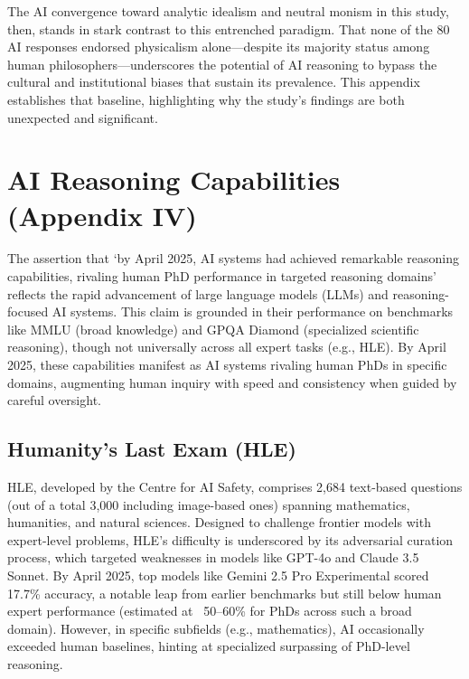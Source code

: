\documentclass[11pt]{article}
\begin{document}
The AI convergence toward analytic idealism and neutral monism in this study, then, stands in stark contrast to this entrenched paradigm. That none of the 80 AI responses endorsed physicalism alone—despite its majority status among human philosophers—underscores the potential of AI reasoning to bypass the cultural and institutional biases that sustain its prevalence. This appendix establishes that baseline, highlighting why the study’s findings are both unexpected and significant.

\section{AI Reasoning Capabilities (Appendix IV)}
The assertion that ‘by April 2025, AI systems had achieved remarkable reasoning capabilities, rivaling human PhD performance in targeted reasoning domains’ reflects the rapid advancement of large language models (LLMs) and reasoning-focused AI systems. This claim is grounded in their performance on benchmarks like MMLU (broad knowledge) and GPQA Diamond (specialized scientific reasoning), though not universally across all expert tasks (e.g., HLE). By April 2025, these capabilities manifest as AI systems rivaling human PhDs in specific domains, augmenting human inquiry with speed and consistency when guided by careful oversight.

\subsection{Humanity’s Last Exam (HLE)}
HLE, developed by the Centre for AI Safety, comprises 2,684 text-based questions (out of a total 3,000 including image-based ones) spanning mathematics, humanities, and natural sciences. Designed to challenge frontier models with expert-level problems, HLE’s difficulty is underscored by its adversarial curation process, which targeted weaknesses in models like GPT-4o and Claude 3.5 Sonnet. By April 2025, top models like Gemini 2.5 Pro Experimental scored 17.7\% accuracy, a notable leap from earlier benchmarks but still below human expert performance (estimated at ~50–60\% for PhDs across such a broad domain). However, in specific subfields (e.g., mathematics), AI occasionally exceeded human baselines, hinting at specialized surpassing of PhD-level reasoning.
\end{document}
